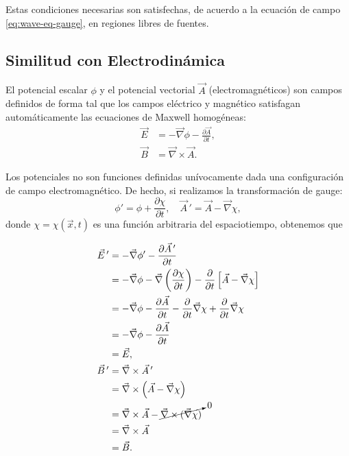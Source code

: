 \documentclass[letterpaper,11pt]{article}
\begin{document}
Estas condiciones necesarias son satisfechas, de acuerdo a la ecuación de campo \eqref{eq:wave-eq-gauge}, en regiones libres de fuentes.

\subsection{Similitud con Electrodinámica}

El potencial escalar $\phi$ y el potencial vectorial $\vec{A}$ (electromagnéticos) son campos definidos de forma tal que los campos eléctrico y magnético satisfagan automáticamente las ecuaciones de Maxwell homogéneas:
\begin{align}
\vec{E} &= - \vec{\nabla} \phi - \frac{\partial \vec{A}}{\partial t},  \label{eq:electro-1} \\
\vec{B} &= \vec{\nabla} \times \vec{A}.  \label{eq:electro-2}
\end{align}

Los potenciales no son funciones definidas unívocamente dada una configuración de campo electromagnético. De hecho, si realizamos la transformación de gauge:
\begin{equation}
\phi' = \phi + \frac{\partial\chi}{\partial t}, \quad \vec{A}\,' = \vec{A} - \vec{\nabla} \chi, \label{eq:electro-3}
\end{equation}
donde $\chi = \chi(\vec{x},t)$ es una función arbitraria del espaciotiempo, obtenemos que

\begin{align}
\vec{E}\,' &= - \vec{\nabla} \phi' - \frac{\partial \vec{A} \,'}{\partial t} \nonumber\\
&= - \vec{\nabla} \phi - \vec{\nabla} \left(\frac{\partial\chi}{\partial t}\right) - \frac{\partial}{\partial t}\left[\vec{A} - \vec{\nabla} \chi\right] \nonumber\\
&= - \vec{\nabla} \phi  - \frac{\partial \vec{A}}{\partial t}  - \frac{\partial}{\partial t} \vec{\nabla} \chi  + \frac{\partial}{\partial t} \vec{\nabla} \chi \nonumber\\  
&=  - \vec{\nabla} \phi  - \frac{\partial \vec{A}}{\partial t}  \nonumber \\
&= \vec{E}, \\
\vec{B}\,' &= \vec{\nabla} \times \vec{A}\,' \nonumber \\
&= \vec{\nabla} \times  \left( \vec{A} - \vec{\nabla} \chi \right)\nonumber \\
&=\vec{\nabla} \times \vec{A} - \cancelto{0}{\vec{\nabla} \times  (\vec{\nabla} \chi)} \nonumber \\ 
&= \vec{\nabla}\times \vec{A} \nonumber \\
&=  \vec{B}.
\end{align}
\end{document}

